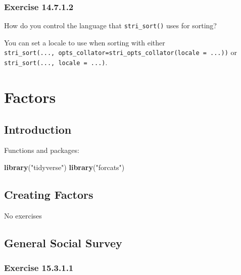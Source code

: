 \documentclass[]{book}
\newenvironment{Shaded}{\begin{snugshade}}{\end{snugshade}}
\newcommand{\KeywordTok}[1]{\textcolor[rgb]{0.13,0.29,0.53}{\textbf{#1}}}
\newcommand{\NormalTok}[1]{#1}
\newcommand{\StringTok}[1]{\textcolor[rgb]{0.31,0.60,0.02}{#1}}
\theoremstyle{plain}
\theoremstyle{remark}
\begin{document}
\hypertarget{exercise-14.7.1.2}{%
\subsection*{\texorpdfstring{Exercise {14.7.1.2}}{Exercise 14.7.1.2}}\label{exercise-14.7.1.2}}

How do you control the language that \texttt{stri\_sort()} uses for sorting?

You can set a locale to use when sorting with either \texttt{stri\_sort(...,\ opts\_collator=stri\_opts\_collator(locale\ =\ ...))} or \texttt{stri\_sort(...,\ locale\ =\ ...)}.

\hypertarget{factors}{%
\chapter{Factors}\label{factors}}

\hypertarget{introduction-10}{%
\section{Introduction}\label{introduction-10}}

Functions and packages:

\begin{Shaded}
\begin{Highlighting}[]
\KeywordTok{library}\NormalTok{(}\StringTok{"tidyverse"}\NormalTok{)}
\KeywordTok{library}\NormalTok{(}\StringTok{"forcats"}\NormalTok{)}
\end{Highlighting}
\end{Shaded}

\hypertarget{creating-factors}{%
\section{Creating Factors}\label{creating-factors}}

No exercises

\hypertarget{general-social-survey}{%
\section{General Social Survey}\label{general-social-survey}}

\hypertarget{exercise-15.3.1.1}{%
\subsection*{\texorpdfstring{Exercise {15.3.1.1}}{Exercise 15.3.1.1}}\label{exercise-15.3.1.1}}
\end{document}
